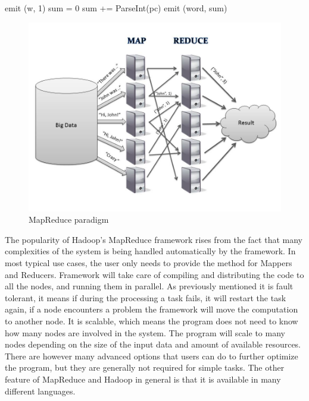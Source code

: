 \documentclass[english]{tktltiki}
\begin{document}
\begin{algorithm}
\begin{algorithmic}
      		\State emit (w, 1)
   \EndFor
\EndFunction
\State 
{}
  \State sum = 0
    \State sum += ParseInt(pc)
    \State emit (word, sum)
\EndFor
\EndFunction
\end{algorithmic}
\end{algorithm}

\begin{figure}[ht!]
\centering
\includegraphics[width=130mm]{figures/mapreduce.jpg}
\caption{MapReduce paradigm}
\end{figure}

The popularity of Hadoop's MapReduce framework rises from the fact that many complexities of the system is being handled automatically by the framework. In most typical use cases, the user only needs to provide the method for Mappers and Reducers. Framework will take care of compiling and distributing the code to all the nodes, and running them in parallel. As previously mentioned it is fault tolerant, it means if during the processing a task fails, it will restart the task again, if a node encounters a problem the framework will move the computation to another node. It is scalable, which means the program does not need to know how many nodes are involved in the system. The program will scale to many nodes depending on the size of the input data and amount of available resources. There are however many advanced options that users can do to further optimize the program, but they are generally not required for simple tasks. The other feature of MapReduce and Hadoop in general is that it is available in many different languages.  
\end{document}
